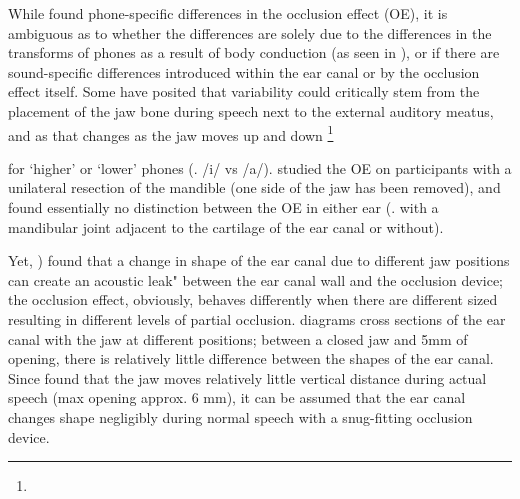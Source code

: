 While \cite{hansen:97b} found phone-specific differences in the occlusion effect (OE), it is ambiguous as to whether the differences are solely due to the differences in the transforms of phones as a result of body conduction (as seen in \cite{reinfeldt:10}), or if there are sound-specific differences introduced within the ear canal or by the occlusion effect itself.  
Some have posited that variability could critically stem from the placement of the jaw bone during speech next to the external auditory meatus, and as that changes as the jaw moves up and down \DIFdelbegin \footnote{} %
\addtocounter{footnote}{-1}%
\DIFdelend for `higher' or `lower' phones (\DIFdelbegin {}\DIFdelend \DIFaddbegin {}\DIFaddend . /i/ vs /a/). \DIFaddbegin {}\DIFaddend \cite{allen:60} studied the OE on participants with a unilateral resection of the mandible (one side of the jaw has been removed), and found essentially no distinction between the OE in either ear (\DIFdelbegin {}\DIFdelend \DIFaddbegin {}\DIFaddend . with a mandibular joint adjacent to the cartilage of the ear canal or without).

Yet, \cite{hansen:97b}) found that a change in shape of the ear canal due to different jaw positions can create an acoustic \DIFdelbegin {}\DIFdelend \DIFaddbegin {}\DIFaddend leak" between the ear canal wall and the occlusion device; the occlusion effect, obviously, behaves differently when there are different sized \DIFdelbegin {}\DIFdelend \DIFaddbegin {}\DIFaddend resulting in different levels of partial occlusion. 
\cite{hansen:97b} diagrams cross sections of the ear canal with the jaw at different positions; between a closed jaw and 5mm of opening, there is relatively little difference between the shapes of the ear canal.  Since \cite{borghese:97} found that the jaw moves relatively little vertical distance during actual speech (max opening approx. 6 mm), it can be assumed that the ear canal changes shape negligibly during normal speech with a snug-fitting occlusion device. 

